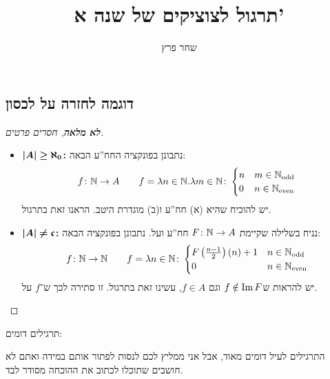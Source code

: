 \documentclass[]{../../../../tex/classes/styledArticle}
\author{שחר פרץ}
\title{תרגול לצוציקים של שנה א'}
\begin{document}
	\maketitle
	\subsection*{דוגמה לחזרה על לכסון}
	\begin{proof}[\textbf{לא מלאה}, חסרים פרטים]
		\begin{itemize}
			\item $\bm{\left \lvert A \right \rvert  \ge \aleph_0}$\textbf{: }נתבונן בפונקציה החח''ע הבאה: 
			\[ f \colon \mathbb{N} \to A \quad \quad f = \lambda n \in \mathbb{N}. \lambda m \in \mathbb{N}\colon \begin{cases}
				n & m \in \mathbb{N}_{\mathrm{odd }} \\
				0 & n \in \mathbb{N}_{\mathrm{even}}
			\end{cases} \]
			יש להוכיח שהיא (א) חח''ע ו(ב) מוגדרת היטב. הראנו זאת בתרגול. 
			\item $\bm{\left \lvert A \right \rvert \neq \mathfrak{c}}$\textbf{: }נניח בשלילה שקיימת $F \colon \mathbb{N} \to A$ חח''ע ועל. נתבונן בפונקציה הבאה: 
			\[ f \colon \mathbb{N} \to \mathbb{N} \quad\quad f = \lambda n \in \mathbb{N}\colon \begin{cases}
				F\left ( \frac{n - 1}{2} \right )(n) + 1 & n \in \mathbb{N}_{\mathrm{odd }} \\
				0 & n \in \mathbb{N}_{\mathrm{even}}
			\end{cases} \]
			יש להראות ש$f \notin \operatorname{Im} F$ וגם $ f \in A$, עשינו זאת בתרגול. זו סתירה לכך ש־$f$ על. 
		\end{itemize}\envendproof
	\end{proof}
	
	תרגילים דומים: 
	
	התרגילים לעיל דומים מאוד, אבל אני ממליץ לכם לנסות לפתור אותם במידה ואתם לא חושבים שתוכלו לכתוב את ההוכחה מסודר לבד. 
	
\end{document}
